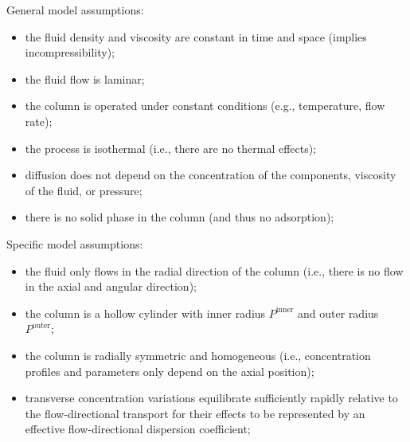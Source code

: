 \documentclass{article}
\begin{document}
General model assumptions:
\begin{itemize}
    \item the fluid density and viscosity are constant in time and space (implies incompressibility);
    \item the fluid flow is laminar;
    \item the column is operated under constant conditions (e.g., temperature, flow rate);
    \item the process is isothermal (i.e., there are no thermal effects);
    \item diffusion does not depend on the concentration of the components, viscosity of the fluid, or pressure;
    \item there is no solid phase in the column (and thus no adsorption);
\end{itemize}

Specific model assumptions:
\begin{itemize}
    \item the fluid only flows in the radial direction of the column (i.e., there is no flow in the axial and angular direction);
    \item the column is a hollow cylinder with inner radius $P^{\mathrm{inner}}$ and outer radius $P^{\mathrm{outer}}$;
    \item the column is radially symmetric and homogeneous (i.e., concentration profiles and parameters only depend on the axial position);
    \item transverse concentration variations equilibrate sufficiently rapidly relative to the flow-directional transport for their effects to be represented by an effective flow-directional dispersion coefficient;
\end{itemize}
\end{document}
